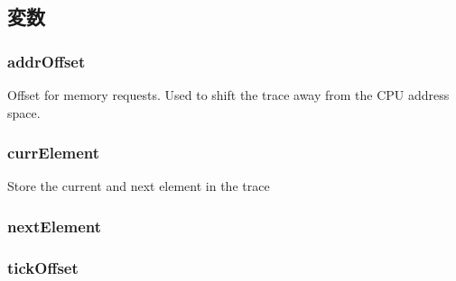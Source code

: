 \subsection{変数}
\hypertarget{classTraceGen_ab197a601b77c63555474cccf2ba4132c}{
\subsubsection[{addrOffset}]{ {\bf addrOffset}}}
\label{classTraceGen_ab197a601b77c63555474cccf2ba4132c}
Offset for memory requests. Used to shift the trace away from the CPU address space. \hypertarget{classTraceGen_a9569c34c782ed59f9eabae29d83b3c69}{
\subsubsection[{currElement}]{ {\bf currElement}}}
\label{classTraceGen_a9569c34c782ed59f9eabae29d83b3c69}
Store the current and next element in the trace \hypertarget{classTraceGen_af75daad6a6b104153bcfc8b0b9738fc1}{
\subsubsection[{nextElement}]{ {\bf nextElement}}}
\label{classTraceGen_af75daad6a6b104153bcfc8b0b9738fc1}
\hypertarget{classTraceGen_a909a0f7344e9c9dc4e84b9db494e3913}{
\subsubsection[{tickOffset}]{ {\bf tickOffset}}}
\label{classTraceGen_a909a0f7344e9c9dc4e84b9db494e3913}
